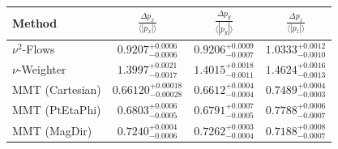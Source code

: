     \begin{tabular}{lccc}
        \toprule
        Method & $\frac{\Delta p_x}{\langle |p_x|\rangle}$ & $\frac{\Delta p_y}{\langle |p_y|\rangle}$ & $\frac{\Delta p_z}{\langle |p_z|\rangle}$ \\
        \midrule
        $\nu^2$-Flows & $0.9207^{+0.0006}_{-0.0006}$ & $0.9206^{+0.0009}_{-0.0007}$ & $1.0333^{+0.0012}_{-0.0010}$ \\
        $\nu$-Weighter & $1.3997^{+0.0021}_{-0.0017}$ & $1.4015^{+0.0018}_{-0.0011}$ & $1.4624^{+0.0016}_{-0.0013}$ \\
        MMT (Cartesian) & $0.66120^{+0.00018}_{-0.00028}$ & $0.6612^{+0.0004}_{-0.0004}$ & $0.7489^{+0.0004}_{-0.0003}$ \\
        MMT (PtEtaPhi) & $0.6803^{+0.0006}_{-0.0005}$ & $0.6791^{+0.0007}_{-0.0005}$ & $0.7788^{+0.0006}_{-0.0007}$ \\
        MMT (MagDir) & $0.7240^{+0.0004}_{-0.0006}$ & $0.7262^{+0.0003}_{-0.0004}$ & $0.7188^{+0.0008}_{-0.0007}$ \\
        \bottomrule
    \end{tabular}